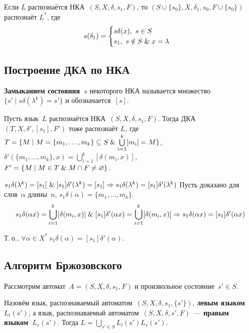 Если $L$ распознаётся НКА~$(S, X, \delta, s_1, F)$, то $(S \cup \{ s_0 \}, X, \delta_1, s_0, F \cup \{ s_0 \})$ распознаёт $L^*$, где
\begin{equation*}
s(\delta_1) =
\begin{cases}
s \delta(x), \ s \in S \\
s_1, \ s \notin S \mathrel{\&} x = \lambda
\end{cases}
\end{equation*}

\subsection{Построение ДКА по НКА}
 \textbf{Замыканием состояния~$s$} некоторого НКА называется множество~$\{ s' \mid s \delta(\lambda^k) = s' \}$ и обозначается~$[s]$.

Пусть язык~$L$ распознаётся НКА~$(S, X, \delta, s_1, F)$.
Тогда ДКА~$(T, X, \delta', [s_1], F')$ тоже распознаёт $L$, где\\
$T = \{ M \mid M = \{ m_1, \ldots, m_k \} \subseteq S \mathrel{\&} \bigcup\limits_{i=1}^k [m_i] = M \}$,\\
$\delta'(\{ m_1, \ldots, m_k \}, x) = \bigcup\limits_{i=1}^k [\delta(m_i, x)]$,\\
$F' = \{ M \mid M \in T \mathrel{\&} M \cap F \neq \varnothing \}$.
\begin{proofmathind}
	\indbase $s_1 \delta(\lambda^k) = [s_1] \mathrel{\&} [s_1] \delta'(\lambda^k) = [s_1] \Rightarrow
	s_1 \delta(\lambda^k) = [s_1] \delta'(\lambda^k)$
	\indstep Пусть доказано для слов~$\alpha$ длины~$n$, $s_1 \delta(\alpha) = \{ m_1, \ldots, m_k \}$.
	\begin{equation*}
	s_1 \delta(\alpha x) = \bigcup_{i=1}^k [\delta(m_i, x)] \mathrel{\&}
	[s_1] \delta'(\alpha x) = \bigcup_{i=1}^k [\delta(m_i, x)] \Rightarrow
	s_1 \delta(\alpha x) = [s_1] \delta'(\alpha x)
	\end{equation*}
	\indend
	
Т.\,о., $\forall \alpha \in X^* \ s_1 \delta(\alpha) = [s_1] \delta'(\alpha)$.
\end{proofmathind}

\subsection{Алгоритм Бржозовского}
Рассмотрим автомат~$A = (S, X, \delta, s_1, F)$ и произвольное состояние~$s' \in S$.

Назовём язык, распознаваемый автоматом~$(S, X, \delta, s_1, \{ s' \})$, \textbf{левым языком~$L_l(s')$}, а язык, распознаваемый автоматом~$(S, X, \delta, s', F)$~--- \textbf{правым языком~$L_r(s')$}.
Тогда $L = \bigcup\limits_{s' \in S} L_l(s') L_r(s')$.

